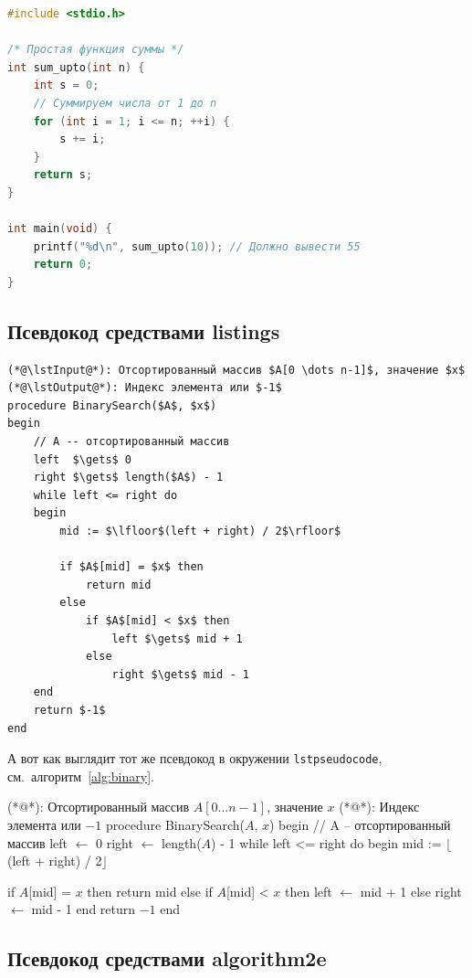 \documentclass[12pt]{extarticle}
\begin{document}
\begin{lstlisting}[language=C,caption={Тест C-кода с русскими комментариями}]
#include <stdio.h>

/* Простая функция суммы */
int sum_upto(int n) {
    int s = 0;
    // Суммируем числа от 1 до n
    for (int i = 1; i <= n; ++i) {
        s += i;
    }
    return s;
}

int main(void) {
    printf("%d\n", sum_upto(10)); // Должно вывести 55
    return 0;
}
\end{lstlisting}
\subsection{Псевдокод средствами listings}
\label{sec:orgf8553b6}

\begin{lstlisting}[style=pseudocode,caption={Псевдокод через listings}]
(*@\lstInput@*): Отсортированный массив $A[0 \dots n-1]$, значение $x$
(*@\lstOutput@*): Индекс элемента или $-1$
procedure BinarySearch($A$, $x$)
begin
    // A -- отсортированный массив
    left  $\gets$ 0
    right $\gets$ length($A$) - 1
    while left <= right do
    begin
        mid := $\lfloor$(left + right) / 2$\rfloor$

        if $A$[mid] = $x$ then
            return mid
        else
            if $A$[mid] < $x$ then
                left $\gets$ mid + 1
            else
                right $\gets$ mid - 1
    end
    return $-1$
end
\end{lstlisting}

А вот как выглядит тот же псевдокод в окружении \texttt{lstpseudocode}, см.~алгоритм~\ref{alg:binary}.

\begin{lstpseudocode}[caption={Псевдокод через LSTpseudocode}, label={alg:binary}]
(*@\lstInput@*): Отсортированный массив $A[0 \dots n-1]$, значение $x$
(*@\lstOutput@*): Индекс элемента или $-1$
procedure BinarySearch($A$, $x$)
begin
    // A -- отсортированный массив
    left  $\gets$ 0
    right $\gets$ length($A$) - 1
    while left <= right do
    begin
        mid := $\lfloor$(left + right) / 2$\rfloor$

        if $A$[mid] = $x$ then
            return mid
        else
            if $A$[mid] < $x$ then
                left $\gets$ mid + 1
            else
                right $\gets$ mid - 1
    end
    return $-1$
end
\end{lstpseudocode}
\subsection{Псевдокод средствами algorithm2e}
\label{sec:org41ffc98}
\end{document}
